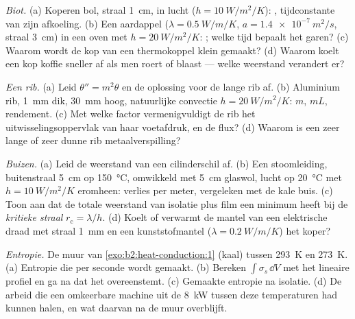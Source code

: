 \begin{exercise}[$\star\star$]\label{exo:b2:heat-conduction:7}
\emph{Biot.} (a) Koperen bol, straal \qty{1}{cm}, in lucht
($h =
\qty{10}{W/m^2/K}$): , tijdconstante van zijn afkoeling. (b)
Een
aardappel ($\lambda = \qty{0.5}{W/m/K}$, $a = \qty{1.4e-7}{m^2/s}$, straal
\qty{3}{cm}) in een oven met $h = \qty{20}{W/m^2/K}$: ; welke
tijd bepaalt het garen? (c) Waarom wordt de kop van een thermokoppel klein gemaakt?
(d) Waarom koelt een kop koffie sneller af als men roert of blaast ---
welke weerstand verandert er?
\end{exercise}

\begin{exercise}[$\star\star$]\label{exo:b2:heat-conduction:8}
\emph{Een rib.} (a) Leid $\theta'' = m^2\theta$ en de oplossing voor de
lange rib af.
(b) Aluminium rib, \qty{1}{mm} dik, \qty{30}{mm} hoog, natuurlijke
convectie $h = \qty{20}{W/m^2/K}$: $m$, $mL$, rendement. (c) Met welke
factor vermenigvuldigt de rib het uitwisselingsoppervlak van haar voetafdruk, en
de flux? (d) Waarom is een zeer lange of zeer dunne rib metaalverspilling?
\end{exercise}

\begin{exercise}[$\star\star$]\label{exo:b2:heat-conduction:9}
\emph{Buizen.} (a) Leid de weerstand van een cilinderschil af. (b) Een
stoomleiding, buitenstraal \qty{5}{cm} op \qty{150}{\celsius}, omwikkeld met
\qty{5}{cm} glaswol, lucht op \qty{20}{\celsius} met $h =
\qty{10}{W/m^2/K}$
eromheen: verlies per meter, vergeleken met de kale buis.
(c) Toon aan dat de totale weerstand van isolatie plus film een
minimum heeft bij de \emph{kritieke straal} $r_{\text{c}} = \lambda/h$. (d)
Koelt of verwarmt
de mantel van een elektrische draad met straal \qty{1}{mm} en een
kunststofmantel ($\lambda =
\qty{0.2}{W/m/K}$) het koper?
\end{exercise}

\begin{exercise}[$\star\star\star$]\label{exo:b2:heat-conduction:10}
\emph{Entropie.} De muur van \cref{exo:b2:heat-conduction:1} (kaal)
tussen \qty{293}{K} en \qty{273}{K}. (a) Entropie die per seconde wordt gemaakt.
(b) Bereken $\int\sigma_s\,\dd V$ met het lineaire profiel en ga na dat het
overeenstemt. (c) Gemaakte entropie na isolatie. (d) De arbeid die een
omkeerbare machine uit de \qty{8}{kW} tussen deze temperaturen had kunnen
halen, en wat daarvan na de muur overblijft.
\end{exercise}

